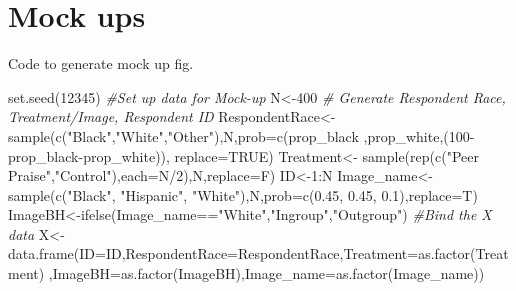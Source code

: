\documentclass[
]{article}
\newenvironment{Shaded}{\begin{snugshade}}{\end{snugshade}}
\newcommand{\AttributeTok}[1]{\textcolor[rgb]{0.77,0.63,0.00}{#1}}
\newcommand{\CommentTok}[1]{\textcolor[rgb]{0.56,0.35,0.01}{\textit{#1}}}
\newcommand{\ConstantTok}[1]{\textcolor[rgb]{0.00,0.00,0.00}{#1}}
\newcommand{\DecValTok}[1]{\textcolor[rgb]{0.00,0.00,0.81}{#1}}
\newcommand{\FloatTok}[1]{\textcolor[rgb]{0.00,0.00,0.81}{#1}}
\newcommand{\FunctionTok}[1]{\textcolor[rgb]{0.00,0.00,0.00}{#1}}
\newcommand{\NormalTok}[1]{#1}
\newcommand{\OtherTok}[1]{\textcolor[rgb]{0.56,0.35,0.01}{#1}}
\newcommand{\SpecialCharTok}[1]{\textcolor[rgb]{0.00,0.00,0.00}{#1}}
\newcommand{\StringTok}[1]{\textcolor[rgb]{0.31,0.60,0.02}{#1}}
\begin{document}
\hypertarget{mock-ups}{%
\section{Mock ups}\label{mock-ups}}

Code to generate mock up fig.

\begin{Shaded}
\begin{Highlighting}[]
\FunctionTok{set.seed}\NormalTok{(}\DecValTok{12345}\NormalTok{)}
\CommentTok{\#Set up data for Mock{-}up}
\NormalTok{N}\OtherTok{\textless{}{-}}\DecValTok{400}
\CommentTok{\# Generate Respondent Race, Treatment/Image, Respondent ID}
\NormalTok{RespondentRace}\OtherTok{\textless{}{-}}\FunctionTok{sample}\NormalTok{(}\FunctionTok{c}\NormalTok{(}\StringTok{"Black"}\NormalTok{,}\StringTok{"White"}\NormalTok{,}\StringTok{"Other"}\NormalTok{),N,}\AttributeTok{prob=}\FunctionTok{c}\NormalTok{(prop\_black}
\NormalTok{                 ,prop\_white,(}\DecValTok{100}\SpecialCharTok{{-}}\NormalTok{prop\_black}\SpecialCharTok{{-}}\NormalTok{prop\_white)), }\AttributeTok{replace=}\ConstantTok{TRUE}\NormalTok{)}
\NormalTok{Treatment}\OtherTok{\textless{}{-}} \FunctionTok{sample}\NormalTok{(}\FunctionTok{rep}\NormalTok{(}\FunctionTok{c}\NormalTok{(}\StringTok{"Peer Praise"}\NormalTok{,}\StringTok{"Control"}\NormalTok{),}\AttributeTok{each=}\NormalTok{N}\SpecialCharTok{/}\DecValTok{2}\NormalTok{),N,}\AttributeTok{replace=}\NormalTok{F)}
\NormalTok{ID}\OtherTok{\textless{}{-}}\DecValTok{1}\SpecialCharTok{:}\NormalTok{N}
\NormalTok{Image\_name}\OtherTok{\textless{}{-}}\FunctionTok{sample}\NormalTok{(}\FunctionTok{c}\NormalTok{(}\StringTok{"Black"}\NormalTok{, }\StringTok{"Hispanic"}\NormalTok{, }\StringTok{"White"}\NormalTok{),N,}\AttributeTok{prob=}\FunctionTok{c}\NormalTok{(}\FloatTok{0.45}\NormalTok{, }\FloatTok{0.45}\NormalTok{, }\FloatTok{0.1}\NormalTok{),}\AttributeTok{replace=}\NormalTok{T)}
\NormalTok{ImageBH}\OtherTok{\textless{}{-}}\FunctionTok{ifelse}\NormalTok{(Image\_name}\SpecialCharTok{==}\StringTok{"White"}\NormalTok{,}\StringTok{"Ingroup"}\NormalTok{,}\StringTok{"Outgroup"}\NormalTok{)}
\CommentTok{\#Bind the X data}
\NormalTok{X}\OtherTok{\textless{}{-}}\FunctionTok{data.frame}\NormalTok{(}\AttributeTok{ID=}\NormalTok{ID,}\AttributeTok{RespondentRace=}\NormalTok{RespondentRace,}\AttributeTok{Treatment=}\FunctionTok{as.factor}\NormalTok{(Treatment)}
\NormalTok{              ,}\AttributeTok{ImageBH=}\FunctionTok{as.factor}\NormalTok{(ImageBH),}\AttributeTok{Image\_name=}\FunctionTok{as.factor}\NormalTok{(Image\_name))}

\end{Highlighting}
\end{Shaded}
\end{document}
